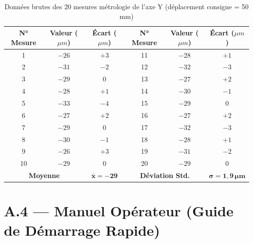 \begin{table}[htbp]
\centering
\renewcommand{\arraystretch}{1.3}
\begin{tabular}{|c|c|c||c|c|c|}
\hline
\rowcolor{macouleur!20}
\textbf{N° Mesure} & \textbf{Valeur ($\mu m$)} & \textbf{Écart ($\mu m$)} & \textbf{N° Mesure} & \textbf{Valeur ($\mu m$)} & \textbf{Écart ($\mu m$)} \\
\hline
1 & $-26$ & $+3$ & 11 & $-28$ & $+1$ \\
2 & $-31$ & $-2$ & 12 & $-32$ & $-3$ \\
3 & $-29$ & $0$ & 13 & $-27$ & $+2$ \\
4 & $-28$ & $+1$ & 14 & $-30$ & $-1$ \\
5 & $-33$ & $-4$ & 15 & $-29$ & $0$ \\
6 & $-27$ & $+2$ & 16 & $-27$ & $+2$ \\
7 & $-29$ & $0$ & 17 & $-32$ & $-3$ \\
8 & $-30$ & $-1$ & 18 & $-28$ & $+1$ \\
9 & $-26$ & $+3$ & 19 & $-31$ & $-2$ \\
10 & $-29$ & $0$ & 20 & $-29$ & $0$ \\
\hline
\multicolumn{2}{|c|}{\textbf{Moyenne}} & $\boldsymbol{\bar{x} = -29}$ & \multicolumn{2}{c|}{\textbf{Déviation Std.}} & $\boldsymbol{\sigma = 1{,}9\,\mu m}$ \\
\hline
\end{tabular}
\caption{Données brutes des 20 mesures métrologie de l'axe Y (déplacement consigne = 50 mm)}
\label{tab:raw_data_y}
\end{table}

\section{A.4 — Manuel Opérateur (Guide de Démarrage Rapide)}

